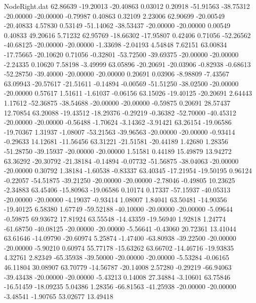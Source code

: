 \begin{filecontents}{NodeRight.dat}
  62.86639  -19.20013  -20.40863     0.03012    0.20918  -51.91563  -38.75312  -20.00000  -20.00000   -0.79987    0.40863    0.32109    2.23006
  62.90699  -20.00549  -20.40833     4.57830    0.53149  -51.14062  -38.53437  -20.00000  -20.00000    0.00549    0.40833   49.20616    5.71232
  62.95769  -18.66302  -17.95807     0.42406    0.71056  -52.26562  -40.68125  -20.00000  -20.00000   -1.33698   -2.04193    4.54848    7.62151
  63.00834  -17.75665  -20.10620     0.71056   -0.32801  -53.72500  -39.69375  -20.00000  -20.00000   -2.24335    0.10620    7.58198   -3.49999
  63.05896  -20.20691  -20.03906    -0.82938   -0.68613  -52.28750  -39.40000  -20.00000  -20.00000    0.20691    0.03906   -8.98809   -7.43567
  63.09943  -20.57617  -21.51611    -0.14894   -0.00569  -51.51250  -38.02500  -20.00000  -20.00000    0.57617    1.51611   -1.61037   -0.06156
  63.15026  -19.40125  -20.20691     2.64443    1.17612  -52.36875  -38.54688  -20.00000  -20.00000   -0.59875    0.20691   28.57437   12.70854
  63.20088  -19.43512  -18.29376    -0.29219   -0.36382  -52.70000  -40.45312  -20.00000  -20.00000   -0.56488   -1.70624   -3.14362   -3.91421
  63.26154  -19.06586  -19.70367     1.31937   -1.08007  -53.21563  -39.96563  -20.00000  -20.00000   -0.93414   -0.29633   14.12681  -11.56456
  63.31221  -21.51581  -20.44189     1.42680    1.28356  -51.28750  -39.15937  -20.00000  -20.00000    1.51581    0.44189   15.49879   13.94272
  63.36292  -20.30792  -21.38184    -0.14894   -0.07732  -51.56875  -38.04063  -20.00000  -20.00000    0.30792    1.38184   -1.60538   -0.83337
  63.40345  -17.21954  -19.50195     0.96124   -0.22057  -54.51875  -39.21250  -20.00000  -20.00000   -2.78046   -0.49805   10.23625   -2.34883
  63.45406  -15.80963  -19.06586     0.10174    0.17337  -57.15937  -40.05313  -20.00000  -20.00000   -4.19037   -0.93414    1.08007    1.84041
  63.50481  -14.90356  -19.40125     6.58380    1.67749  -59.52188  -40.10000  -20.00000  -20.00000   -5.09644   -0.59875   69.93672   17.81924
  63.55548  -14.43359  -19.56940     1.92818    1.24774  -61.68750  -40.08125  -20.00000  -20.00000   -5.56641   -0.43060   20.72361   13.41044
  63.61646  -14.09790  -20.60974     5.25874   -1.47400  -63.80938  -39.22500  -20.00000  -20.00000   -5.90210    0.60974   55.77178  -15.63262
  63.66702  -14.46716  -19.93835     4.32761    2.82349  -65.35938  -39.50000  -20.00000  -20.00000   -5.53284   -0.06165   46.11804   30.08907
  63.70779  -14.56787  -20.14008     2.57280   -0.29219  -66.94063  -39.43438  -20.00000  -20.00000   -5.43213    0.14008   27.34884   -3.10601
  63.75846  -16.51459  -18.09235     5.04386    1.28356  -66.81563  -41.25938  -20.00000  -20.00000   -3.48541   -1.90765   53.02677   13.49418

\end{filecontents}
